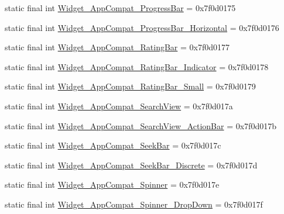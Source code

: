 \begin{DoxyCompactItemize}
\item 
static final int \mbox{\hyperlink{classandroid_1_1support_1_1v7_1_1appcompat_1_1R_1_1style_ab390a7d95b35ab9e44076a85e154b7f3}{Widget\+\_\+\+App\+Compat\+\_\+\+Progress\+Bar}} = 0x7f0d0175
\item 
static final int \mbox{\hyperlink{classandroid_1_1support_1_1v7_1_1appcompat_1_1R_1_1style_a2199021cd967c56ad7d210cf7f9b7954}{Widget\+\_\+\+App\+Compat\+\_\+\+Progress\+Bar\+\_\+\+Horizontal}} = 0x7f0d0176
\item 
static final int \mbox{\hyperlink{classandroid_1_1support_1_1v7_1_1appcompat_1_1R_1_1style_a3162c72dc44f36cd6cc9874a45606128}{Widget\+\_\+\+App\+Compat\+\_\+\+Rating\+Bar}} = 0x7f0d0177
\item 
static final int \mbox{\hyperlink{classandroid_1_1support_1_1v7_1_1appcompat_1_1R_1_1style_a4e630a9181d7e7c7102763f465ede0ed}{Widget\+\_\+\+App\+Compat\+\_\+\+Rating\+Bar\+\_\+\+Indicator}} = 0x7f0d0178
\item 
static final int \mbox{\hyperlink{classandroid_1_1support_1_1v7_1_1appcompat_1_1R_1_1style_a1c763de27988dced0b144631166a4461}{Widget\+\_\+\+App\+Compat\+\_\+\+Rating\+Bar\+\_\+\+Small}} = 0x7f0d0179
\item 
static final int \mbox{\hyperlink{classandroid_1_1support_1_1v7_1_1appcompat_1_1R_1_1style_a0b9debe2b59a9eced1c10518295bd0a8}{Widget\+\_\+\+App\+Compat\+\_\+\+Search\+View}} = 0x7f0d017a
\item 
static final int \mbox{\hyperlink{classandroid_1_1support_1_1v7_1_1appcompat_1_1R_1_1style_a30aafb9867d041573f7441a2cc5508b0}{Widget\+\_\+\+App\+Compat\+\_\+\+Search\+View\+\_\+\+Action\+Bar}} = 0x7f0d017b
\item 
static final int \mbox{\hyperlink{classandroid_1_1support_1_1v7_1_1appcompat_1_1R_1_1style_a0fdbb17c1225846598a112c9be4ed827}{Widget\+\_\+\+App\+Compat\+\_\+\+Seek\+Bar}} = 0x7f0d017c
\item 
static final int \mbox{\hyperlink{classandroid_1_1support_1_1v7_1_1appcompat_1_1R_1_1style_ad2c239017b173840245dee18a0f012ae}{Widget\+\_\+\+App\+Compat\+\_\+\+Seek\+Bar\+\_\+\+Discrete}} = 0x7f0d017d
\item 
static final int \mbox{\hyperlink{classandroid_1_1support_1_1v7_1_1appcompat_1_1R_1_1style_af170a0011c6171b97922217fd714bfdb}{Widget\+\_\+\+App\+Compat\+\_\+\+Spinner}} = 0x7f0d017e
\item 
static final int \mbox{\hyperlink{classandroid_1_1support_1_1v7_1_1appcompat_1_1R_1_1style_a0911e8d3f56d1ceca6ee2f3e4dd58a57}{Widget\+\_\+\+App\+Compat\+\_\+\+Spinner\+\_\+\+Drop\+Down}} = 0x7f0d017f

\end{DoxyCompactItemize}

